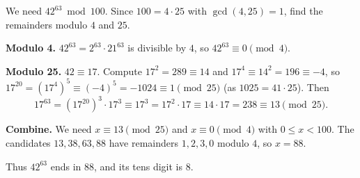 We need $42^{63}\bmod 100$. Since $100=4\cdot25$ with $\gcd(4,25)=1$, find the remainders modulo $4$ and $25$.

\textbf{Modulo 4.} $42^{63}=2^{63}\cdot21^{63}$ is divisible by $4$, so $42^{63}\equiv0\pmod4$.

\textbf{Modulo 25.} $42\equiv17$. Compute $17^2=289\equiv14$ and $17^4\equiv14^2=196\equiv-4$, so $17^{20}=\left(17^4\right)^5\equiv(-4)^5=-1024\equiv1\pmod{25}$ (as $1025=41\cdot25$). Then
\[17^{63}=\left(17^{20}\right)^3\cdot17^3\equiv17^3=17^2\cdot17\equiv14\cdot17=238\equiv13\pmod{25}.\]

\textbf{Combine.} We need $x\equiv13\pmod{25}$ and $x\equiv0\pmod4$ with $0\le x<100$. The candidates $13,38,63,88$ have remainders $1,2,3,0$ modulo $4$, so $x=88$.

Thus $42^{63}$ ends in $88$, and its tens digit is $\boxed{8}$.
